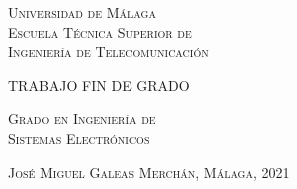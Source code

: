 
\thispagestyle{empty}


	\begin{center}
		\Large \scshape
		Universidad de Málaga\\
		\bigskip
		Escuela Técnica Superior de\\
		Ingeniería de Telecomunicación
	\end{center}

	\bigskip


\bigskip

	\bigskip \bigskip \bigskip \bigskip

	\begin{center}
		\Large \scshape
		TRABAJO FIN DE GRADO
	\end{center}

	\bigskip \bigskip \bigskip \bigskip

	\begin{center}
		\huge \scshape
		\tfgtitlename %
	\end{center}

	\vfill

	\begin{center}
		\Large \scshape
		Grado en Ingeniería de\\
		Sistemas Electrónicos
	\end{center}

	\bigskip \bigskip \bigskip \bigskip


	\begin{flushright}
		\large \scshape
		{José Miguel Galeas Merchán}, %
		Málaga, 2021%
	\end{flushright}



\blankpage
